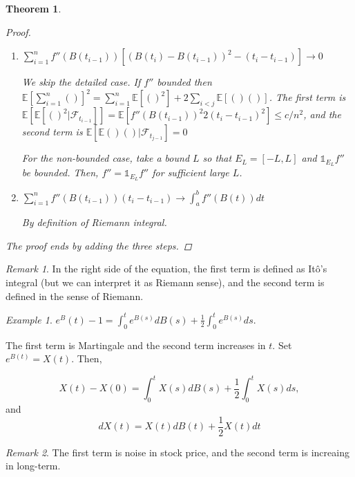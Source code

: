 \documentclass[12pt]{report}
\newcommand{\F}{\mathcal{F}}
\newcommand{\E}{\mathbb{E}}
\renewcommand{\1}{\mathbb{1}}
\theoremstyle{break}
\newtheorem{thm}{Theorem}[section] %
\theoremstyle{newdef}
\theoremstyle{remark}
\newtheorem*{exmp}{Example} %
\newtheorem*{rem}{Remark} %
\begin{document}
\begin{thm}
\begin{proof}
\begin{enumerate}[label={\bfseries STEP \arabic*}, wide]
($\because$
let $M = \max\{B(t): t\in[a,b]\}$ and $m = \min\{B(t): t\in[a,b]\}$.
Then
$$
Z(\delta) = \sup_{x,y\in[m,M], |x-y|<\delta} |f''(y)-f''(x)| \rightarrow 0
$$
as $\delta \searrow 0$ by uniform continuity.
Moreover $D_n := \sup_{i=1\sim n} |B(t_i) - B(t_{i-1})| \rightarrow 0$ as $n\rightarrow\infty$ since Brownian motion is a.s. continous.
Then, $Y_n \leq Z(D_n) \rightarrow 0$ a.s. as $n\rightarrow 0$.)

\item
$\sum_{i=1}^n f''(B(t_{i-1}))\left[ (B(t_i) - B(t_{i-1}))^2 - (t_i-t_{i-1}) \right] \rightarrow 0$

We skip the detailed case.
If $f''$ bounded then
$\E[\sum_{i=1}^n()]^2 = \sum_{i=1}^n \E[()^2] + 2\sum_{i<j}\E[()()]$.
The first term is $\E[\E[()^2|\F_{t_{i-1}}]] = \E[f''(B(t_{i-1}))^2 2(t_i-t_{i-1})^2] \leq c/n^2$,
and the second term is $\E[\E()()|\F_{t_{j-1}}] = 0$

For the non-bounded case, take a bound $L$ so that $E_L = [-L, L]$ and $\1_{E_L}f''$ be bounded.
Then, $f'' = \1_{E_L}f''$ for sufficient large $L$.

\item
$\sum_{i=1}^n f''(B(t_{i-1}))(t_i-t_{i-1}) \rightarrow \int_a^b f''(B(t))dt$

By definition of Riemann integral.
\end{enumerate}
The proof ends by adding the three steps.
\end{proof}
\end{thm}

\begin{rem}
In the right side of the equation, the first term is defined as It\^o's integral (but we can interpret it as Riemann sense), and the second term is defined in the sense of Riemann.
\end{rem}


\begin{exmp}
$e^B(t) - 1= \int_0^t e^{B(s)}dB(s) + \frac{1}{2}\int_0^t e^{B(s)}ds.$

The first term is Martingale and the second term increases in $t$.
Set $e^{B(t)} = X(t)$.
Then,

$$
X(t) - X(0) = \int_0^t X(s) dB(s) + \frac{1}{2} \int_0^t X(s)ds,
$$
and
\begin{equation}
dX(t) = X(t)dB(t) + \frac{1}{2}X(t)dt\tag{SDE}
\end{equation}
\end{exmp}

\begin{rem}
The first term is noise in stock price, and the second term is increaing in long-term.
\end{rem}
\end{document}

